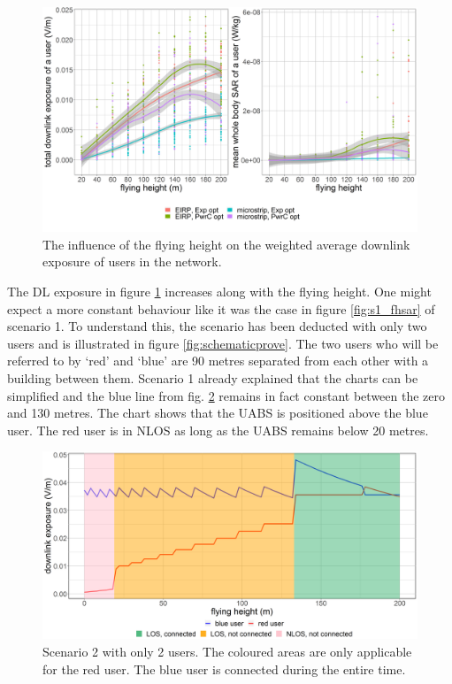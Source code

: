 \begin{figure}[h!]
  \includegraphics[width=\textwidth]{../results/s2/fhvsdlAndPc.png}
  \caption{The influence of the flying height on the weighted average downlink exposure of users in the network.}
  \label{fig:s2a_dlAndPc}
\end{figure}



The \gls{DL} exposure in figure \ref{fig:s2a_dlAndPc} increases along with the flying height. One might expect a more constant 
behaviour like it was the case in figure \ref{fig:s1_fhsar} of scenario 1. To understand this, the scenario has been deducted 
with only two users and is illustrated in figure \ref{fig:schematicprove}.
The two users who will be referred to by `red' and `blue' are 90 metres separated from each other with a building between them.
Scenario 1 already explained that the charts can be simplified and the blue line from fig. \ref{fig:prove} remains in fact constant between the zero and 130 metres.
The chart shows that the \gls{UABS} is positioned above the blue user. The red user is in \gls{NLOS} as long as the \gls{UABS} remains below 20 metres.

\begin{figure}[]
  \includegraphics[width=\textwidth]{../results/s2/prove.png}
  \caption{Scenario 2 with only 2 users. The coloured areas are only applicable for the red user. The blue user is connected during the entire time.}
  \label{fig:prove}
\end{figure}


